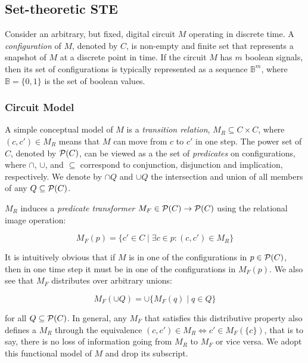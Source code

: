 \subsection{Set-theoretic STE}

Consider an arbitrary, but fixed, digital circuit $M$ operating in discrete time. A \textit{configuration} of $M$, denoted by $C$, is non-empty and finite set that represents a snapshot of $M$ at a discrete point in time. If the circuit $M$ has $m$ boolean signals, then its set of configurations is typically represented as a sequence $\mathbb{B}^{m}$, where $\mathbb{B} = \{ 0,1 \}$ is the set of boolean values.

\subsubsection{Circuit Model} A simple conceptual model of $M$ is a \textit{transition relation}, $M_{R} \subseteq C \times C$, where $(c,c') \in M_{R}$ means that $M$ can move from $c$ to $c'$ in one step\footnotemark. The power set of $C$, denoted by $\mathcal{P}(C)$, can be viewed as a the set of \textit{predicates} on configurations, where $\cap$, $\cup$, and $\subseteq$ correspond to conjunction, disjunction and implication, respectively. We denote by $\cap Q$ and $\cup Q$ the intersection and union of all members of any $Q \subseteq \mathcal{P}(C)$.


$M_{R}$ induces a \textit{predicate transformer} $M_{F} \in \mathcal{P}(C) \rightarrow \mathcal{P}(C)$ using the relational image operation:

\begin{equation*}
M_{F}(p) = \{ c' \in C \mid \exists c \in p : (c,c') \in M_{R} \}
\end{equation*}

\noindent It is intuitively obvious that if $M$ is in one of the configurations in $p \in \mathcal{P}(C)$, then in one time step it must be in one of the configurations in $M_{F}(p)$. We also see that $M_{F}$ distributes over arbitrary unions:

\begin{equation*}
M_{F}(\cup Q) = \cup \{ M_{F}(q) \mid q \in Q \}
\end{equation*}

\noindent for all $Q \subseteq \mathcal{P}(C)$. In general, any $M_{F}$ that satisfies this distributive property also defines a $M_{R}$ through the equivalence $(c,c') \in M_{R} \iff c' \in M_{F}(\{ c \})$, that is to say, there is no loss of information going from $M_{R}$ to $M_{F}$ or vice versa. We adopt this functional model of $M$ and drop its subscript.


